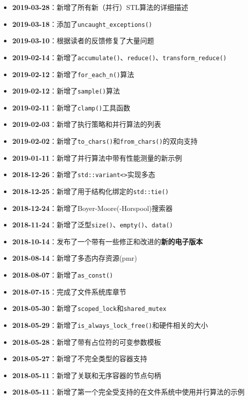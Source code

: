\begin{itemize}
    \item \textbf{2019-03-28}：新增了所有新（并行）STL算法的详细描述
    \item \textbf{2019-03-18}：添加了\texttt{uncaught\_exceptions()}
    \item \textbf{2019-03-10}：根据读者的反馈修复了大量问题
    \item \textbf{2019-02-14}：新增了\texttt{accumulate()}、\texttt{reduce()}、\texttt{transform\_reduce()}
    \item \textbf{2019-02-12}：新增了\texttt{for\_each\_n()}算法
    \item \textbf{2019-02-12}：新增了\texttt{sample()}算法
    \item \textbf{2019-02-11}：新增了\texttt{clamp()}工具函数
    \item \textbf{2019-02-03}：新增了执行策略和并行算法的列表
    \item \textbf{2019-02-02}：新增了\texttt{to\_chars()}和\texttt{from\_chars()}的双向支持
    \item \textbf{2019-01-11}：新增了并行算法中带有性能测量的新示例
    \item \textbf{2018-12-26}：新增了\texttt{std::variant<>}实现多态
    \item \textbf{2018-12-25}：新增了用于结构化绑定的\texttt{std::tie()}
    \item \textbf{2018-12-24}：新增了Boyer-Moore(-Horspool)搜索器
    \item \textbf{2018-11-24}：新增了泛型\texttt{size()}、\texttt{empty()}、\texttt{data()}
    \item \textbf{2018-10-14}：发布了一个带有一些修正和改进的\textbf{新的电子版本}
    \item \textbf{2018-08-14}：新增了多态内存资源(pmr)
    \item \textbf{2018-08-07}：新增了\texttt{as\_const()}
    \item \textbf{2018-07-15}：完成了文件系统库章节
    \item \textbf{2018-05-30}：新增了\texttt{scoped\_lock}和\texttt{shared\_mutex}
    \item \textbf{2018-05-29}：新增了\texttt{is\_always\_lock\_free()}和硬件相关的大小
    \item \textbf{2018-05-28}：新增了带有占位符的可变参数模板
    \item \textbf{2018-05-27}：新增了不完全类型的容器支持
    \item \textbf{2018-05-11}：新增了关联和无序容器的节点句柄
    \item \textbf{2018-05-11}：新增了第一个完全受支持的在文件系统中使用并行算法的示例

\end{itemize}
